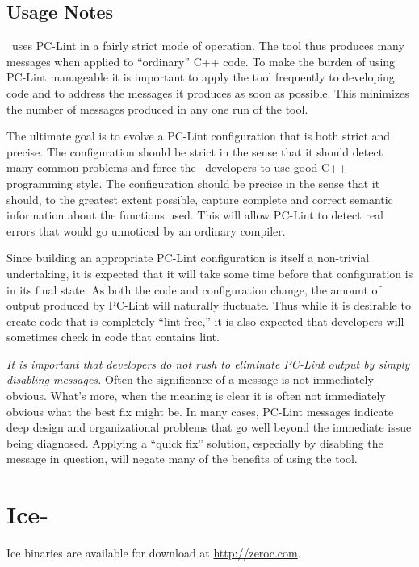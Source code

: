 \subsection{Usage Notes}

\VTank\ uses PC-Lint in a fairly strict mode of operation. The tool thus produces many messages when applied to ``ordinary'' C++ code. To make the burden of using PC-Lint manageable it is important to apply the tool frequently to developing code and to address the messages it produces as soon as possible. This minimizes the number of messages produced in any one run of the tool.

The ultimate goal is to evolve a PC-Lint configuration that is both strict and precise. The configuration should be strict in the sense that it should detect many common problems and force the \VTank\ developers to use good C++ programming style. The configuration should be precise in the sense that it should, to the greatest extent possible, capture complete and correct semantic information about the functions used. This will allow PC-Lint to detect real errors that would go unnoticed by an ordinary compiler.

Since building an appropriate PC-Lint configuration is itself a non-trivial undertaking, it is expected that it will take some time before that configuration is in its final state. As both the code and configuration change, the amount of output produced by PC-Lint will naturally fluctuate. Thus while it is desirable to create code that is completely ``lint free,'' it is also expected that developers will sometimes check in code that contains lint.

\emph{It is important that developers do not rush to eliminate PC-Lint output by simply disabling messages.} Often the significance of a message is not immediately obvious. What's more, when the meaning is clear it is often not immediately obvious what the best fix might be. In many cases, PC-Lint messages indicate deep design and organizational problems that go well beyond the immediate issue being diagnosed. Applying a ``quick fix'' solution, especially by disabling the message in question, will negate many of the benefits of using the tool.

\section{Ice-\IceVersion}

Ice binaries are available for download at \url{http://zeroc.com}.

